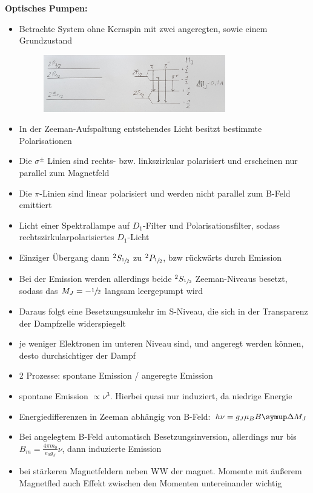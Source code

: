 \textbf{Optisches Pumpen:}
\begin{itemize}
    \item Betrachte System ohne Kernspin mit zwei angeregten, sowie einem Grundzustand
      \begin{figure}[H]
          \centering
          \includegraphics[width=0.75\textwidth]{figures/beispiel.jpg}
        \end{figure}
    \item In der Zeeman-Aufspaltung entstehendes Licht besitzt bestimmte Polarisationen
    \item Die $\sigma^\pm$ Linien sind rechts- bzw. linkszirkular polarisiert und erscheinen nur parallel zum Magnetfeld
    \item Die $\pi$-Linien sind linear polarisiert und werden nicht parallel zum B-Feld emittiert
    \item Licht einer Spektrallampe auf $D_1$-Filter und Polarisationsfilter, sodass rechtszirkularpolarisiertes $D_1$-Licht
    \item Einziger Übergang dann $^2S_{\sfrac{1}{2}}$ zu $^2P_{\sfrac{1}{2}}$, bzw rückwärts durch Emission
    \item Bei der Emission werden allerdings beide $^2S_{\sfrac{1}{2}}$ Zeeman-Niveaus besetzt, sodass das $M_J = -\sfrac{1}{2}$ langsam leergepumpt wird
    \item Daraus folgt eine Besetzungsumkehr im S-Niveau, die sich in der Transparenz der Dampfzelle widerspiegelt
    \item je weniger Elektronen im unteren Niveau sind, und angeregt werden können, desto durchsichtiger der Dampf
    \item 2 Prozesse: spontane Emission / angeregte Emission
    \item spontane Emission $\propto \nu^3$. Hierbei quasi nur induziert, da niedrige Energie
    \item Energiedifferenzen in Zeeman abhängig von B-Feld: $h\nu = g_J\mu_BB\upD M_J$
    \item Bei angelegtem B-Feld automatisch Besetzungsinversion, allerdings nur bis $B_m = \frac{4\pi m_0}{e_0g_J}\nu$, dann induzierte Emission
    \item bei stärkeren Magnetfeldern neben WW der magnet. Momente mit äußerem Magnetfled auch Effekt zwischen den Momenten untereinander wichtig

\end{itemize}
